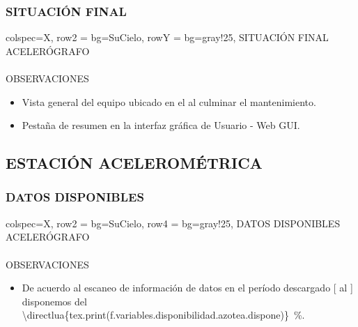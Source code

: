 \subsubsection{SITUACIÓN FINAL}
\begin{tblr}{
    colspec={X},
    row{2} = {bg=SuCielo},
    row{Y} = {bg=gray!25},
}
    SITUACIÓN FINAL \\
    ACELERÓGRAFO \MakeUppercase{} \\
     \\
    OBSERVACIONES \\
    \begin{itemize}
        \item Vista general del equipo ubicado en el  al culminar el mantenimiento.
        \item Pestaña de resumen en la interfaz gráfica de Usuario - Web GUI.
    \end{itemize}
\end{tblr}
\subsection{ESTACIÓN ACELEROMÉTRICA \MakeUppercase{}}
\subsubsection{DATOS DISPONIBLES}
\begin{tblr}[long]{
        colspec={X},
        row{2} = {bg=SuCielo},
        row{4} = {bg=gray!25},
    }
    DATOS DISPONIBLES \\
    ACELERÓGRAFO \MakeUppercase{} \\
     \\
    OBSERVACIONES \\
    \begin{itemize}
        \item De acuerdo al escaneo de información de datos en el período descargado [ al ] disponemos del \qty{\directlua{tex.print(f.variables.disponibilidad.azotea.dispone)}}{\percent}.
    \end{itemize}
\end{tblr}
